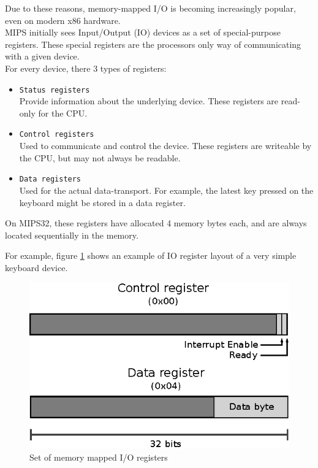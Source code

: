  Due to these reasons,
memory-mapped I/O is becoming increasingly popular, even on modern x86
hardware\cite{osdev:io_ports}.\\
MIPS initially sees Input/Output (IO) devices as a set of special-purpose registers. These
special registers are the processors only way of communicating with a given
device.\\
For every device, there 3 types of
registers\cite{cs_uwm:memory_mapped_io}\cite{imgtec:pra}:
\begin{itemize}
	\item \texttt{Status registers}\\
	Provide information about the underlying device. These registers are
	read-only for the CPU.

	\item \texttt{Control registers}\\
	Used to communicate and control the device. These registers are
	writeable by the CPU, but may not always be readable.

	\item \texttt{Data registers}\\
	Used for the actual data-transport. For example, the latest key pressed
	on the keyboard might be stored in a data register.
\end{itemize}

On MIPS32, these registers have allocated 4 memory bytes each, and are
always located sequentially in the memory.

For example, figure \ref{fig:io_registers} shows an example of IO register
layout of a very simple keyboard device.
\begin{figure}[H]
	\centering
	\includegraphics[scale=1]{io/io_registers.eps}
	\caption{Set of memory mapped I/O registers\cite{imgtec:pra}}
	\label{fig:io_registers}
\end{figure}

